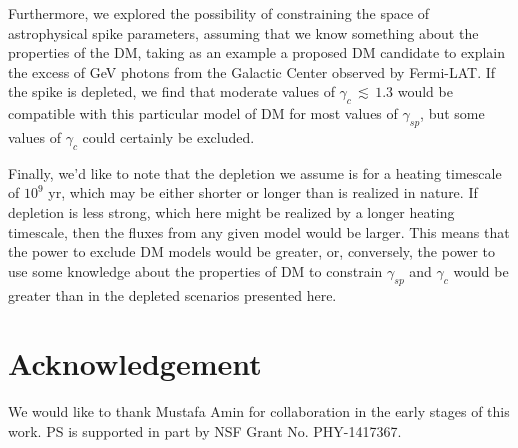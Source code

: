 \documentclass[11pt]{article}
\begin{document}
Furthermore, we explored the possibility of constraining the space of astrophysical spike parameters, assuming that we know something about the properties of the DM, taking as an example a proposed DM candidate to explain the excess of GeV photons from the Galactic Center observed by Fermi-LAT.  If the spike is depleted, we find that moderate values of $\gamma_c \, \lesssim \, 1.3$ would be compatible with this particular model of DM for most values of $\gamma_{sp}$, but some values of $\gamma_{c}$ could certainly be excluded. 

Finally, we'd like to note that the depletion we assume is for a heating timescale of $10^9$ yr, which may be either shorter or longer than is realized in nature.  If depletion is less strong, which here might be realized by a longer heating timescale, then the fluxes from any given model would be larger.  This means that the power to exclude DM models would be greater, or, conversely, the power to use some knowledge about the properties of DM to constrain $\gamma_{sp}$ and $\gamma_c$ would be greater than in the depleted scenarios presented here.


\section{Acknowledgement}

We would like to thank Mustafa Amin for collaboration in the early stages of this work. PS is supported in part by NSF Grant No. PHY-1417367.
\end{document}
